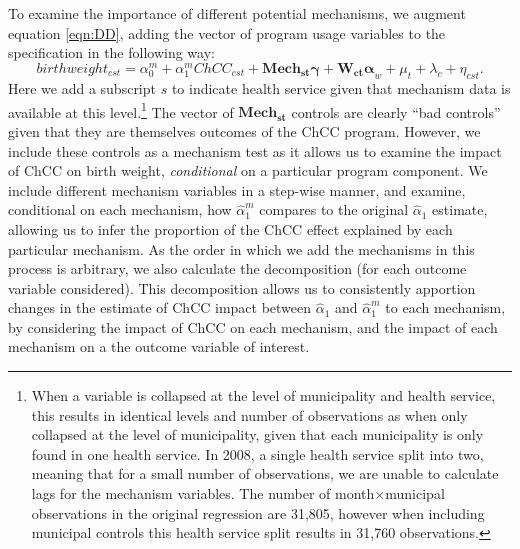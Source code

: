 \documentclass[12pt]{article}
\begin{document}
\begin{spacing}{1.4}
To examine the importance of different potential mechanisms, we augment
equation \ref{eqn:DD}, adding the vector of program usage variables to
the specification in the following way:
\begin{equation}
  \label{eqn:DDmech}
  birthweight_{cst} = \alpha^m_0 + \alpha^m_1 ChCC_{cst} + \bm{Mech_{st}\gamma} + \bm{W_{ct}\alpha}_{w} + \mu_t + \lambda_c + \eta_{cst}.
\end{equation}
Here we add a subscript $s$ to indicate health service given that mechanism
data is available at this level.\footnote{When a variable is collapsed at
  the level of municipality and health service, this results in identical
  levels and number of observations as when only collapsed at the level of
  municipality, given that each municipality is only found in one health
  service.  In 2008, a single health service split into two, meaning that
  for a small number of observations, we are unable to calculate lags for
  the mechanism variables.  The number of month$\times$municipal observations
  in the original regression are 31,805, however when including municipal
controls this health service split results in 31,760 observations.}
The vector of $\bm{Mech_{st}}$ controls are clearly ``bad controls''
\citep{AngristPischke2009} given that they are themselves outcomes of the
ChCC program. However, we include these controls as a mechanism test as
it allows us to examine the impact of ChCC on birth weight,
\emph{conditional} on a particular program component.  We include
different mechanism variables in a step-wise manner, and examine, conditional
on each mechanism, how $\widehat\alpha_1^m$ compares to the original
$\widehat\alpha_1$ estimate, allowing us to infer the proportion of the
ChCC effect explained by each particular mechanism.  As the order in
which we add the mechanisms in this process is arbitrary, %
we also calculate the \citet{Gelbach2016} decomposition (for each
outcome variable considered).  This decomposition allows us to consistently
apportion changes in the estimate of ChCC impact between $\widehat\alpha_1$
and $\widehat\alpha_1^m$ to each mechanism, by considering the impact of ChCC
on each mechanism, and the impact of each mechanism on a the outcome
variable of interest.


\end{spacing}
\end{document}
